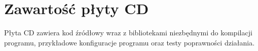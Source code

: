 \chapter{Zawartość płyty CD}
\thispagestyle{chapterBeginStyle}
\label{plytaCD}

Płyta CD zawiera kod źródłowy wraz z bibliotekami niezbędnymi do kompilacji programu, 
przykładowe konfiguracje programu oraz testy poprawności działania.
